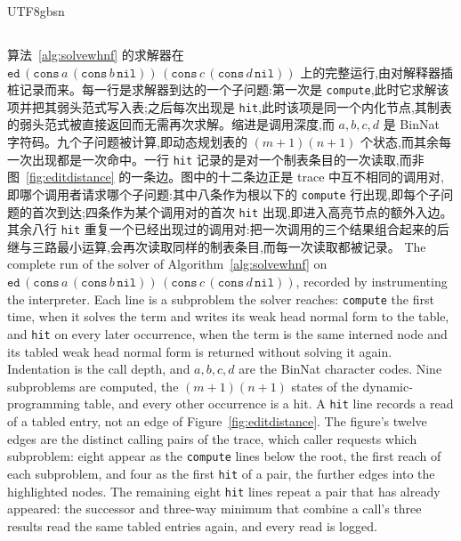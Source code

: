 \begin{CJK*}{UTF8}{gbsn}
  \subsection{}\label{app:editdistance-trace}
  \ifPaperChinese
  算法~\ref{alg:solvewhnf} 的求解器在 $\mathtt{ed}\,(\mathtt{cons}\,a\,(\mathtt{cons}\,b\,\mathtt{nil}))\allowbreak\,(\mathtt{cons}\,c\,(\mathtt{cons}\,d\,\mathtt{nil}))$ 上的完整运行,由对解释器插桩记录而来。每一行是求解器到达的一个子问题:第一次是 \texttt{compute},此时它求解该项并把其弱头范式写入表;之后每次出现是 \texttt{hit},此时该项是同一个内化节点,其制表的弱头范式被直接返回而无需再次求解。缩进是调用深度,而 $a,b,c,d$ 是 BinNat 字符码。九个子问题被计算,即动态规划表的 $(m{+}1)(n{+}1)$ 个状态,而其余每一次出现都是一次命中。一行 \texttt{hit} 记录的是对一个制表条目的一次读取,而非图~\ref{fig:editdistance} 的一条边。图中的十二条边正是 trace 中互不相同的调用对,即哪个调用者请求哪个子问题:其中八条作为根以下的 \texttt{compute} 行出现,即每个子问题的首次到达;四条作为某个调用对的首次 \texttt{hit} 出现,即进入高亮节点的额外入边。其余八行 \texttt{hit} 重复一个已经出现过的调用对:把一次调用的三个结果组合起来的后继与三路最小运算,会再次读取同样的制表条目,而每一次读取都被记录。
  \else
  The complete run of the solver of Algorithm~\ref{alg:solvewhnf} on $\mathtt{ed}\,(\mathtt{cons}\,a\,(\mathtt{cons}\,b\,\mathtt{nil}))\allowbreak\,(\mathtt{cons}\,c\,(\mathtt{cons}\,d\,\mathtt{nil}))$, recorded by instrumenting the interpreter. Each line is a subproblem the solver reaches: \texttt{compute} the first time, when it solves the term and writes its weak head normal form to the table, and \texttt{hit} on every later occurrence, when the term is the same interned node and its tabled weak head normal form is returned without solving it again. Indentation is the call depth, and $a,b,c,d$ are the BinNat character codes. Nine subproblems are computed, the $(m{+}1)(n{+}1)$ states of the dynamic-programming table, and every other occurrence is a hit. A \texttt{hit} line records a read of a tabled entry, not an edge of Figure~\ref{fig:editdistance}. The figure's twelve edges are the distinct calling pairs of the trace, which caller requests which subproblem: eight appear as the \texttt{compute} lines below the root, the first reach of each subproblem, and four as the first \texttt{hit} of a pair, the further edges into the highlighted nodes. The remaining eight \texttt{hit} lines repeat a pair that has already appeared: the successor and three-way minimum that combine a call's three results read the same tabled entries again, and every read is logged.
  \fi
  


\end{CJK*}
